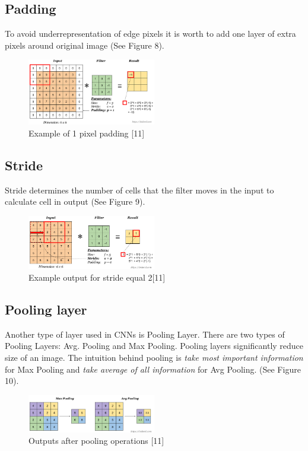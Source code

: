 \subsection{Padding}

To avoid underrepresentation of edge pixels it is worth to add one layer of extra pixels around original image (See Figure 8).


\begin{figure}
\centering
\includegraphics[width=0.5\textwidth]{Images/padding.png}
\caption{Example of 1 pixel padding [11]}
\end{figure}

\subsection{Stride}

Stride determines the number of cells that the filter moves in the input to calculate cell in output (See Figure 9).

\begin{figure}
\centering
\includegraphics[width=0.5\textwidth]{Images/stride.png}
\caption{Example output for stride equal 2[11]}
\end{figure}

\subsection{Pooling layer}

Another type of layer used in CNNs is Pooling Layer. There are two types of Pooling Layers: Avg. Pooling and Max Pooling.  Pooling layers significantly reduce size of an image. The intuition behind pooling is \textit{take most important information} for Max Pooling and \textit{take average of all information} for Avg Pooling. (See Figure 10).

\begin{figure}
\centering
\includegraphics[width=0.5\textwidth]{Images/pooling-layer.png}
\caption{Outputs after pooling operations [11]}
\end{figure}


